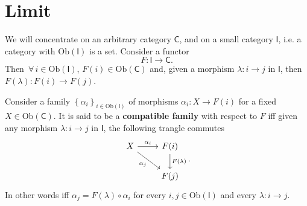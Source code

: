 \section{Limit}
We will concentrate on an arbitrary category $\mathsf{C}$, and on a small category $\mathsf{I}$, i.e. a category with $\mathrm{Ob} \left(\mathsf{I}\right)$ is a set.
Consider a functor 
\begin{equation}
F: \mathsf{I} \to \mathsf{C}
.\end{equation} 
Then $\,\forall\, i \in \mathrm{Ob} \left(\mathsf{I}\right)$, $F(i) \in \mathrm{Ob} \left(\mathsf{C}\right)$ and,
given a morphism $\lambda: i \to j$ in $\mathsf{I}$, then $F(\lambda): F(i) \to F(j)$.

\begin{defn}
	Consider a family $\left\{ \alpha_i \right\}_{i \in \mathrm{Ob} \left(\mathsf{I}\right)}$ of morphisms 
	$\alpha_i: X \to F(i)$ for a fixed $X \in \mathrm{Ob} \left(\mathsf{C}\right)$.
	It is said to be a \textbf{compatible family} with respect to $F$ iff
	given any morphism $\lambda: i \to j$ in $\mathsf{I}$, the following trangle commutes
	\begin{equation}
	\begin{tikzcd}
		X \arrow[r, "\alpha_i", rightarrow] \arrow[rd, "\alpha_j"', rightarrow] &
		F(i) \arrow[d, "F(\lambda)", rightarrow] \\
		&
		F(j)
	\end{tikzcd}
	.\end{equation} 
	In other words iff $\alpha_j = F(\lambda) \circ \alpha_i$ for every $i, j \in \mathrm{Ob} \left(\mathsf{I}\right)$ and every $\lambda: i \to j$.
\end{defn}

